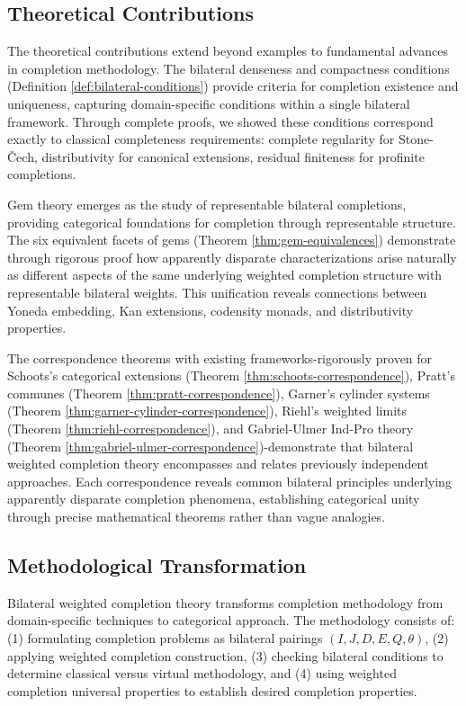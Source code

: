 \documentclass[11pt]{article}
\theoremstyle{plain}
\theoremstyle{definition}
\theoremstyle{remark}
\begin{document}
\subsection{Theoretical Contributions}

The theoretical contributions extend beyond examples to fundamental advances in completion methodology. The bilateral denseness and compactness conditions (Definition \ref{def:bilateral-conditions}) provide criteria for completion existence and uniqueness, capturing domain-specific conditions within a single bilateral framework. Through complete proofs, we showed these conditions correspond exactly to classical completeness requirements: complete regularity for Stone-\v{C}ech, distributivity for canonical extensions, residual finiteness for profinite completions.

Gem theory emerges as the study of representable bilateral completions, providing categorical foundations for completion through representable structure. The six equivalent facets of gems (Theorem \ref{thm:gem-equivalences}) demonstrate through rigorous proof how apparently disparate characterizations arise naturally as different aspects of the same underlying weighted completion structure with representable bilateral weights. This unification reveals connections between Yoneda embedding, Kan extensions, codensity monads, and distributivity properties.

The correspondence theorems with existing frameworks-rigorously proven for Schoots's categorical extensions (Theorem \ref{thm:schoots-correspondence}), Pratt's communes (Theorem \ref{thm:pratt-correspondence}), Garner's cylinder systems (Theorem \ref{thm:garner-cylinder-correspondence}), Riehl's weighted limits (Theorem \ref{thm:riehl-correspondence}), and Gabriel-Ulmer Ind-Pro theory (Theorem \ref{thm:gabriel-ulmer-correspondence})-demonstrate that bilateral weighted completion theory encompasses and relates previously independent approaches. Each correspondence reveals common bilateral principles underlying apparently disparate completion phenomena, establishing categorical unity through precise mathematical theorems rather than vague analogies.

\subsection{Methodological Transformation}

Bilateral weighted completion theory transforms completion methodology from domain-specific techniques to categorical approach. The methodology consists of: (1) formulating completion problems as bilateral pairings $(I, J, D, E, Q, \theta)$, (2) applying weighted completion construction, (3) checking bilateral conditions to determine classical versus virtual methodology, and (4) using weighted completion universal properties to establish desired completion properties.
\end{document}
